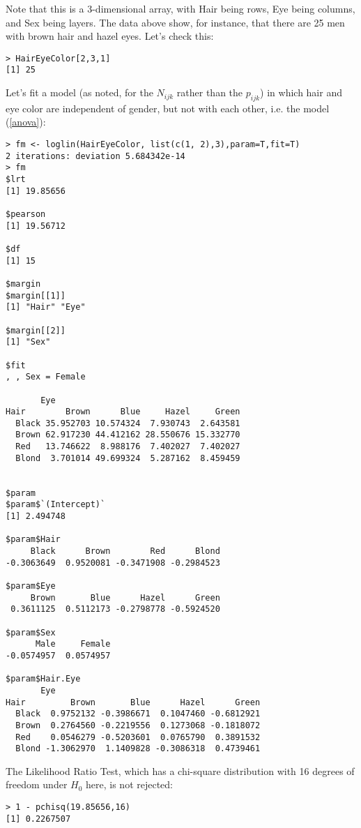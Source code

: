 Note that this is a 3-dimensional array, with Hair being rows, Eye being
columns, and Sex being layers.  The data above show, for instance, that
there are 25 men with brown hair and hazel eyes.  Let's check this:

\begin{lstlisting}
> HairEyeColor[2,3,1]
[1] 25
\end{lstlisting}

Let's fit a model (as noted, for the $N_{ijk}$ rather than the
$p_{ijk}$) in which hair and eye color are independent of gender, but
not with each other, i.e. the model (\ref{anova}):

\begin{lstlisting}
> fm <- loglin(HairEyeColor, list(c(1, 2),3),param=T,fit=T)
2 iterations: deviation 5.684342e-14 
> fm
$lrt
[1] 19.85656
       
$pearson    
[1] 19.56712

$df
[1] 15
  
$margin
$margin[[1]]
[1] "Hair" "Eye"

$margin[[2]]
[1] "Sex"

$fit
, , Sex = Female

       Eye
Hair        Brown      Blue     Hazel     Green
  Black 35.952703 10.574324  7.930743  2.643581
  Brown 62.917230 44.412162 28.550676 15.332770
  Red   13.746622  8.988176  7.402027  7.402027
  Blond  3.701014 49.699324  5.287162  8.459459

     
$param      
$param$`(Intercept)`
[1] 2.494748

$param$Hair
     Black      Brown        Red      Blond 
-0.3063649  0.9520081 -0.3471908 -0.2984523 
  
$param$Eye
     Brown       Blue      Hazel      Green 
 0.3611125  0.5112173 -0.2798778 -0.5924520 
          
$param$Sex
      Male     Female 
-0.0574957  0.0574957 
          
$param$Hair.Eye
       Eye
Hair         Brown       Blue      Hazel      Green
  Black  0.9752132 -0.3986671  0.1047460 -0.6812921
  Brown  0.2764560 -0.2219556  0.1273068 -0.1818072
  Red    0.0546279 -0.5203601  0.0765790  0.3891532
  Blond -1.3062970  1.1409828 -0.3086318  0.4739461
\end{lstlisting}

The Likelihood Ratio Test, which has a chi-square distribution with 16
degrees of freedom under $H_0$ here, is not rejected:

\begin{lstlisting}
> 1 - pchisq(19.85656,16)
[1] 0.2267507
\end{lstlisting}

